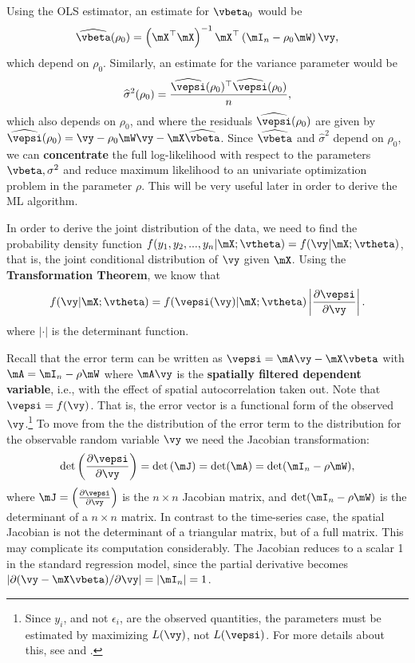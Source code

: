 \documentclass[english,12pt]{book}\usepackage[]{graphicx}\usepackage[]{xcolor}
\begin{document}
Using the OLS estimator, an estimate for $\vbeta_0$ would be
\begin{equation*}
\widehat{\vbeta}(\rho_0) = \left(\mX^\top \mX\right)^{-1}\mX^\top\left(\mI_n - \rho_0\mW\right)\vy,
\end{equation*}
%
which depend on $\rho_0$. Similarly, an estimate for the variance parameter would be
\begin{equation*}
\widehat{\sigma}^2(\rho_0) = \frac{\widehat{\vepsi}(\rho_0)^\top\widehat{\vepsi}(\rho_0)}{n},
\end{equation*}
%
which also depends on $\rho_0$, and where the residuals $\widehat{\vepsi}(\rho_0)$ are given by $\widehat{\vepsi}(\rho_0)=\vy - \rho_0\mW\vy - \mX\widehat{\vbeta}$. Since $\widehat{\vbeta}$ and $\widehat{\sigma}^2$ depend on $\rho_0$, we can \textbf{concentrate} the full log-likelihood with respect to the parameters $\vbeta, \sigma^2$ and reduce maximum likelihood to an univariate optimization problem in the parameter $\rho$. This will be very useful later in order to derive the ML algorithm.

In order to derive the joint distribution of the data, we need to find the probability density function $f(y_1, y_2,...,y_n| \mX; \vtheta) = f(\vy|\mX;\vtheta)$, that is, the joint conditional distribution of $\vy$ given $\mX$. Using the \textbf{Transformation Theorem}, we know that
\begin{equation*}
  f(\vy | \mX; \vtheta) = f(\vepsi(\vy)| \mX; \vtheta) \left|\frac{\partial \vepsi}{\partial \vy}\right|.
\end{equation*}
%
where $\left|\cdot\right|$ is the determinant function. 

Recall that the error term can be written as $\vepsi = \mA\vy - \mX\vbeta$ with $\mA=\mI_n - \rho\mW$ where $\mA\vy$ is the \textbf{spatially filtered dependent variable}, i.e., with the effect of spatial autocorrelation taken out. Note that $\vepsi = f(\vy)$. That is, the error vector is a functional form of the observed $\vy$.\footnote{Since $y_i$, and not $\epsilon_i$, are the observed quantities, the parameters must be estimated by maximizing $L(\vy)$, not $L(\vepsi)$. For more details about this, see \cite{mead1967mathematical} and \cite{doreian1981estimating}.} To move from the the distribution of the error term to the distribution for the observable random variable $\vy$ we need the Jacobian transformation:
\begin{equation*}
\det\left(\frac{\partial \vepsi}{\partial \vy}\right)= \det\left(\mJ\right)=\det(\mA)=\det(\mI_n - \rho\mW),
\end{equation*}
%
where $\mJ = \left(\frac{\partial \vepsi}{\partial \vy}\right)$ is the $n\times n$ Jacobian matrix, and $\det(\mI_n - \rho\mW)$ is the determinant of a $ n \times n$ matrix. In contrast to the time-series case, the spatial Jacobian is not the determinant of a triangular matrix, but of a full matrix. This may complicate its computation considerably. The Jacobian reduces to a scalar 1 in the standard regression model, since the partial derivative becomes $\left|\partial (\vy - \mX\vbeta)/ \partial \vy\right| = \left|\mI_n\right| = 1$. 
\end{document}

